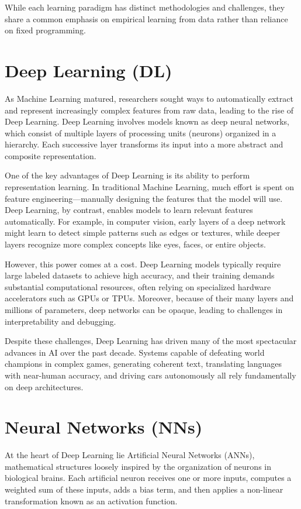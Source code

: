 \documentclass[openany]{book}
\begin{document}
While each learning paradigm has distinct methodologies and challenges, they 
share a common emphasis on empirical learning from data rather than reliance on 
fixed programming.

\section{Deep Learning (DL)}

As Machine Learning matured, researchers sought ways to automatically extract 
and represent increasingly complex features from raw data, leading to the rise 
of Deep Learning. Deep Learning involves models known as deep neural networks, 
which consist of multiple layers of processing units (neurons) organized in a 
hierarchy. Each successive layer transforms its input into a more abstract and 
composite representation.

One of the key advantages of Deep Learning is its ability to perform 
representation learning. In traditional Machine Learning, much effort is spent 
on feature engineering—manually designing the features that the model will use. 
Deep Learning, by contrast, enables models to learn relevant features 
automatically. For example, in computer vision, early layers of a deep network 
might learn to detect simple patterns such as edges or textures, while deeper 
layers recognize more complex concepts like eyes, faces, or entire objects.

However, this power comes at a cost. Deep Learning models typically require 
large labeled datasets to achieve high accuracy, and their training demands 
substantial computational resources, often relying on specialized hardware 
accelerators such as GPUs or TPUs. Moreover, because of their many layers and 
millions of parameters, deep networks can be opaque, leading to challenges in 
interpretability and debugging.

Despite these challenges, Deep Learning has driven many of the most spectacular 
advances in AI over the past decade. Systems capable of defeating world 
champions in complex games, generating coherent text, translating languages with
near-human accuracy, and driving cars autonomously all rely fundamentally on 
deep architectures.

\section{Neural Networks (NNs)}

At the heart of Deep Learning lie Artificial Neural Networks (ANNs), 
mathematical structures loosely inspired by the organization of neurons in 
biological brains. Each artificial neuron receives one or more inputs, computes 
a weighted sum of these inputs, adds a bias term, and then applies a non-linear 
transformation known as an activation function.
\end{document}

